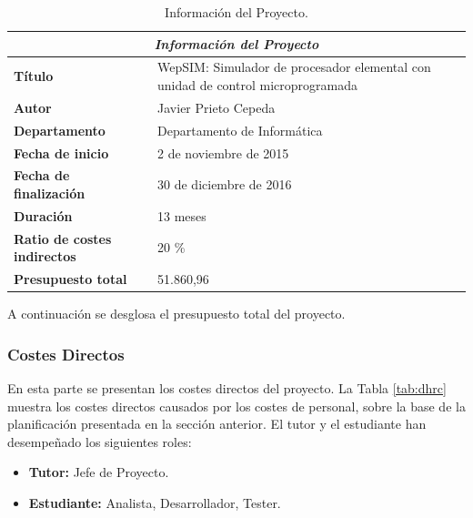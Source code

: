 \begin{center}
\begin{table}[htbp]
\centering
\caption{Información del Proyecto.}
\begin{tabular}{@{}p{3.5cm} p{9cm}@{}} 
\toprule
\multicolumn{2}{c}{\textbf{\textit{Información del Proyecto}}}\\
\midrule
\textbf{Título} 					& WepSIM: Simulador de procesador elemental con unidad de control microprogramada \\
\midrule
\textbf{Autor} 					& Javier Prieto Cepeda \\
\midrule
\textbf{Departamento} 				& Departamento de Informática \\
\midrule
\textbf{Fecha de inicio}				&2 de noviembre de 2015 \\
\midrule
\textbf{Fecha de finalización}				& 30 de diciembre de 2016 \\
\midrule
\textbf{Duración} 				& 13 meses \\
\midrule
\textbf{Ratio de costes indirectos} 	& 20 \% \\
\midrule
\textbf{Presupuesto total} 			& 51.860,96 \\
\bottomrule
\end{tabular}
\label{tab:project_information}
\end{table}
\end{center}

\vspace{5cm}

A continuación se desglosa el presupuesto total del proyecto.

\subsubsection{Costes Directos}

En esta parte se presentan los costes directos del proyecto. La Tabla \ref{tab:dhrc} muestra los costes directos causados por los costes de personal, sobre la base de la planificación presentada en la sección anterior. El tutor y el estudiante han desempeñado los siguientes roles:

\begin{itemize}

\item \textbf{Tutor:} Jefe de Proyecto.

\item \textbf{Estudiante:} Analista, Desarrollador, Tester.

\end{itemize} 

